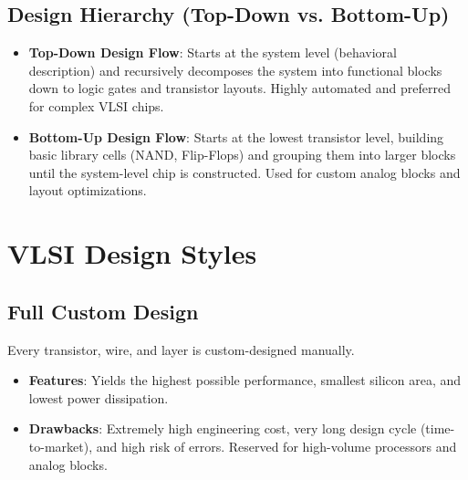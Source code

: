 \documentclass[12pt,a4paper]{article}
\begin{document}
\begin{tcolorbox}[tikzbox, title={Gajski-Yuhan Y-Chart Design Flow}]
\end{tcolorbox}

\subsection{Design Hierarchy (Top-Down vs. Bottom-Up)}
\begin{itemize}[leftmargin=*, itemsep=3.5pt]
  \item \textbf{Top-Down Design Flow}: Starts at the system level (behavioral description) and recursively decomposes the system into functional blocks down to logic gates and transistor layouts. Highly automated and preferred for complex VLSI chips.
  \item \textbf{Bottom-Up Design Flow}: Starts at the lowest transistor level, building basic library cells (NAND, Flip-Flops) and grouping them into larger blocks until the system-level chip is constructed. Used for custom analog blocks and layout optimizations.
\end{itemize}

\section{VLSI Design Styles}

\subsection{Full Custom Design}
Every transistor, wire, and layer is custom-designed manually.
\begin{itemize}[leftmargin=*, itemsep=3.5pt]
  \item \textbf{Features}: Yields the highest possible performance, smallest silicon area, and lowest power dissipation.
  \item \textbf{Drawbacks}: Extremely high engineering cost, very long design cycle (time-to-market), and high risk of errors. Reserved for high-volume processors and analog blocks.
\end{itemize}
\end{document}
